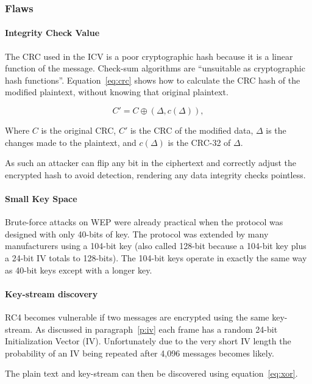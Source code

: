 \documentclass[pdftex, 11pt, a4paper]{article}
\begin{document}
\subsubsection{Flaws}

\paragraph{Integrity Check Value}
The CRC used in the ICV is a poor cryptographic hash because it is a linear function of the message. Check-sum algorithms are ``unsuitable as cryptographic hash functions''\cite{wiki-crc}. Equation~\ref{eq:crc} shows how to calculate the CRC hash of the modified plaintext, without knowing that original plaintext.

\begin{equation}\label{eq:crc}
C'=C \oplus (\Delta ,c(\Delta)),
\end{equation}

Where $C$ is the original CRC, $C'$ is the CRC of the modified data, $\Delta$ is the changes made to the plaintext, and $c(\Delta)$ is the CRC-32 of $\Delta$.

As such an attacker can flip any bit in the ciphertext and correctly adjust the encrypted hash to avoid detection, rendering any data integrity checks pointless.

\paragraph{Small Key Space}
Brute-force attacks on WEP were already practical when the protocol was designed with only 40-bits of key.  The protocol was extended by many manufacturers using a 104-bit key (also called 128-bit because a 104-bit key plus a 24-bit IV totals to 128-bits).  The 104-bit keys operate in exactly the same way as 40-bit keys except with a longer key.

\paragraph{Key-stream discovery}
RC4 becomes vulnerable if two messages are encrypted using the same key-stream.  As discussed in paragraph~\ref{p:iv} each frame has a random 24-bit Initialization Vector (IV).  Unfortunately due to the very short IV length the probability of an IV being repeated after 4,096 messages becomes likely.

The plain text and key-stream can then be discovered using equation~\ref{eq:xor}.
\end{document}
